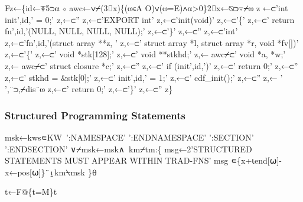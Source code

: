 \documentclass{article}%
\begin{document}
\nwenddocs{}\plusendmoddef\nwstartdeflinemarkup{}\nwenddeflinemarkup
Fz←\{id←⍕5⊃⍺ ⋄ awc←∨⌿(3⌷x)\{(⍵∊A O)∨(⍵=E)∧⍺>0\}2⌷x←⍉⊃⍪⌿⍵
        z ←⊂'int init',id,' = 0;'
        z,←⊂''
        z,←⊂'EXPORT int'
        z,←⊂'init(void)'
        z,←⊂'\{'
        z,←⊂' return fn',id,'(NULL, NULL, NULL, NULL);'
        z,←⊂'\}'
        z,←⊂''
        z,←⊂'int'
        z,←⊂'fn',id,'(struct array **z, '
        z,←⊂'    struct array *l, struct array *r, void *fv[])'
        z,←⊂'\{'
        z,←⊂'       void    *stk[128];'
        z,←⊂'       void    **stkhd;'
        z,← awc⌿⊂'        void    *a, *w;'
        z,← awc⌿⊂'        struct  closure *c;'
        z,←⊂''
        z,←⊂'       if (init',id,')'
        z,←⊂'               return 0;'
        z,←⊂''
        z,←⊂'       stkhd = &stk[0];'
        z,←⊂'       init',id,' = 1;'
        z,←⊂'       cdf_init();'
        z,←⊂''
        z,← ' ',¨⊃,⌿dis¨⍵
        z,←⊂'       return 0;'
        z,←⊂'\}'
        z,←⊂''
z\}
\nwendcode{}\nwdocspar

\subsubsection{Structured Programming Statements}

\nwenddocs{}\endmoddef\nwstartdeflinemarkup{}\nwenddeflinemarkup
msk←kws∊KW~':NAMESPACE' ':ENDNAMESPACE' ':SECTION' ':ENDSECTION'
∨⌿msk←msk∧~km⌿tm:\{
        msg←2'STRUCTURED STATEMENTS MUST APPEAR WITHIN TRAD-FNS'
        msg  ∊\{x+⍳end[⍵]-x←pos[⍵]\}¨⍸km⍀msk
\}⍬
\nwendcode{}\nwdocspar

\nwenddocs{}\endmoddef\nwstartdeflinemarkup{}\nwenddeflinemarkup
t←F@\{t=M\}t
\nwendcode{}\nwdocspar
\end{document}
